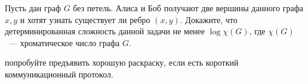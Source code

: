 Пусть дан граф $G$ без петель. Алиса и Боб получают две вершины данного графа $x, y$ и хотят узнать
существует ли ребро $(x, y)$. Докажите, что детерминированная сложность данной задачи не менее $\log
\chi(G)$, где $\chi(G)$~--- хроматическое число графа $G$.

 попробуйте предъявить хорошую раскраску, если есть короткий коммуникационный
протокол.